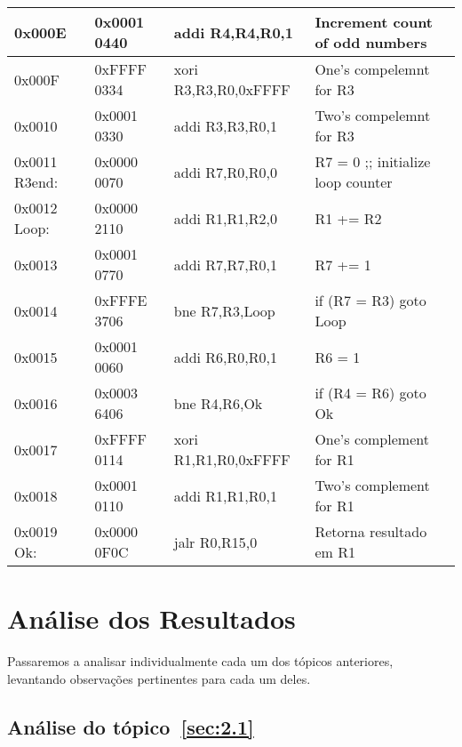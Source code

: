 \documentclass[12pt]{article}
\begin{document}
\begin{table}[H]
\begin{tabular}{|l|l|l|l|}
        0x000E        & 0x0001 0440 & addi R4,R4,R0,1      & Increment count of odd numbers                        \\\hline
        0x000F        & 0xFFFF 0334 & xori R3,R3,R0,0xFFFF & One's compelemnt for R3                               \\\hline
        0x0010        & 0x0001 0330 & addi R3,R3,R0,1      & Two's compelemnt for R3                               \\\hline
        0x0011 R3end: & 0x0000 0070 & addi R7,R0,R0,0      & R7 = 0 ;; initialize loop counter                     \\\hline
        0x0012 Loop:  & 0x0000 2110 & addi R1,R1,R2,0      & R1 += R2                                              \\\hline
        0x0013        & 0x0001 0770 & addi R7,R7,R0,1      & R7 += 1                                               \\\hline
        0x0014        & 0xFFFE 3706 & bne  R7,R3,Loop      & if (R7 \!= R3) goto Loop                              \\\hline
        0x0015        & 0x0001 0060 & addi R6,R0,R0,1      & R6 = 1                                                \\\hline
        0x0016        & 0x0003 6406 & bne  R4,R6,Ok        & if (R4 \!= R6) goto Ok                                \\\hline
        0x0017        & 0xFFFF 0114 & xori R1,R1,R0,0xFFFF & One's complement for R1                               \\\hline
        0x0018        & 0x0001 0110 & addi R1,R1,R0,1      & Two's complement for R1                               \\\hline
        0x0019 Ok:    & 0x0000 0F0C & jalr R0,R15,0        & Retorna resultado em R1                               \\\hline
    \end{tabular}\label{tab:programs:mult}
\end{table}


\section{Análise dos Resultados}\label{sec:resultados}

Passaremos a analisar individualmente cada um dos tópicos anteriores, levantando
observações pertinentes para cada um deles.

\subsection{Análise do tópico~\ref{sec:2.1}}\label{sec:analise2.1}
\end{document}
